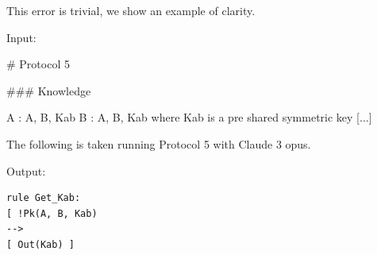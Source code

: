 






    

\begin{Example}
\label{Ex:semantic_error_sharing_key}
This error is trivial, we show an example of clarity.

\noindent Input:
\begin{spverbatim}
# Protocol 5

### Knowledge

A : A, B, Kab
B : A, B, Kab
where Kab is a pre shared symmetric key
[...]
\end{spverbatim}

The following is taken running Protocol 5 with Claude 3 opus.

\noindent Output:
\begin{verbatim}
rule Get_Kab:
[ !Pk(A, B, Kab)
-->
[ Out(Kab) ]
\end{verbatim}
\end{Example}

